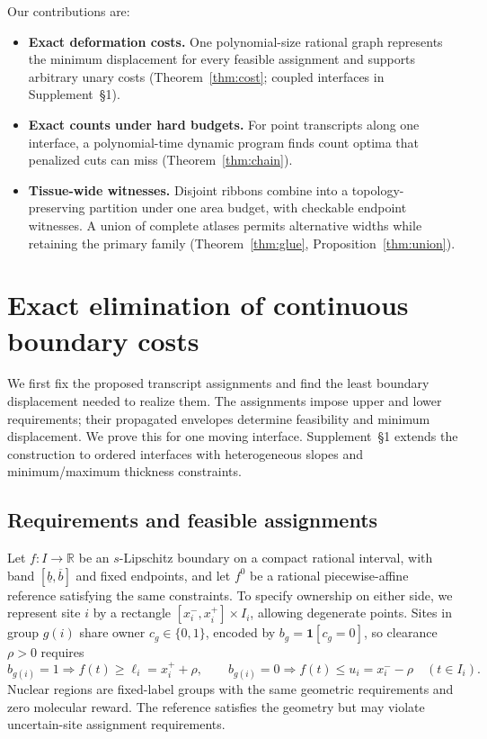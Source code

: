 \documentclass[10pt,letterpaper]{article}
\newcommand{\ind}{\mathbf 1}
\begin{document}
Our contributions are:
\begin{itemize}
\item \textbf{Exact deformation costs.} One polynomial-size rational graph represents the minimum displacement for every feasible assignment and supports arbitrary unary costs (Theorem~\ref{thm:cost}; coupled interfaces in Supplement~\S1).
\item \textbf{Exact counts under hard budgets.} For point transcripts along one interface, a polynomial-time dynamic program finds count optima that penalized cuts can miss (Theorem~\ref{thm:chain}).
\item \textbf{Tissue-wide witnesses.} Disjoint ribbons combine into a topology-preserving partition under one area budget, with checkable endpoint witnesses. A union of complete atlases permits alternative widths while retaining the primary family (Theorem~\ref{thm:glue}, Proposition~\ref{thm:union}).
\end{itemize}

\section{Exact elimination of continuous boundary costs}\label{sec:engine}
We first fix the proposed transcript assignments and find the least boundary displacement needed to realize them. The assignments impose upper and lower requirements; their propagated envelopes determine feasibility and minimum displacement. We prove this for one moving interface. Supplement~\S1 extends the construction to ordered interfaces with heterogeneous slopes and minimum/maximum thickness constraints.

\subsection{Requirements and feasible assignments}
Let $f:I\to\mathbb R$ be an $s$-Lipschitz boundary on a compact rational interval, with band $[\underline b,\overline b]$ and fixed endpoints, and let $f^0$ be a rational piecewise-affine reference satisfying the same constraints. To specify ownership on either side, we represent site $i$ by a rectangle $[x_i^-,x_i^+]\times I_i$, allowing degenerate points. Sites in group $g(i)$ share owner $c_g\in\{0,1\}$, encoded by $b_g=\ind[c_g=0]$, so clearance $\rho>0$ requires
\begin{equation}
 b_{g(i)}=1\Rightarrow f(t)\ge\ell_i=x_i^++\rho,\qquad
 b_{g(i)}=0\Rightarrow f(t)\le u_i=x_i^--\rho\quad(t\in I_i).\label{eq:owners}
\end{equation}
Nuclear regions are fixed-label groups with the same geometric requirements and zero molecular reward. The reference satisfies the geometry but may violate uncertain-site assignment requirements.
\end{document}
